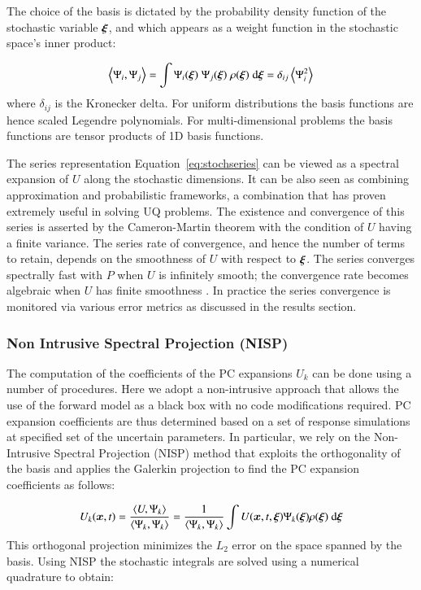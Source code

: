 The choice of the basis is dictated by the probability density
function of the stochastic variable $\xxi$, and which appears as a weight
function in the stochastic space's inner product:

\begin{equation}
 \left<\Psi_i,\Psi_j\right> = \int \Psi_i(\xxi) \;\Psi_j(\xxi) \; \rho(\xxi) \; \mbox{d}\xxi=\delta_{ij}\ave{\Psi_i^2}
\label{eq:inner}
\end{equation}
where $\delta_{ij}$ is the Kronecker delta.
For uniform
distributions the basis functions are hence scaled Legendre polynomials.
For multi-dimensional problems the basis functions are
tensor products of 1D basis functions.

The series representation Equation~\eqref{eq:stochseries} can be viewed as a spectral expansion
of $U$ along the stochastic dimensions. It can be also seen as
combining approximation and probabilistic frameworks, a combination
that has proven extremely useful in solving UQ problems. The existence and convergence of this series
is asserted by the Cameron-Martin theorem \citep{Cameron:1947} with the condition of $U$ having a finite variance.
The series rate of convergence, and hence the number of terms to retain, depends on the smoothness of
$U$ with respect to $\xxi$. The series converges spectrally fast with $P$
when $U$ is infinitely smooth; the convergence rate becomes algebraic
when $U$ has finite smoothness \citep{Canuto:2006}. In practice the series convergence is monitored 
via various error metrics as discussed in the results section.

\subsubsection{Non Intrusive Spectral Projection (NISP)}
The computation of the coefficients of the PC expansions $U_k$
can be done using a number of procedures. Here we adopt a non-intrusive
approach that allows the use of the forward model \geoclaw as a black box
with no code modifications required. PC expansion coefficients are thus determined
based on a set of response \geoclaw simulations at specified set of the uncertain parameters. 
In particular, we rely on the Non-Intrusive Spectral Projection (NISP) method that exploits the orthogonality of the basis and applies the Galerkin projection to find the PC expansion coefficients as follows:

\begin{equation}
 U_k(\bm{x},t) = \frac{\left< U, \Psi_k \right>}{\left< \Psi_k, \Psi_k \right>} = 
 \frac{1}{\left< \Psi_k, \Psi_k \right>} 
 \int U(\bm{x},t,\xxi) \Psi_k(\xxi) \rho(\xxi) \mbox{ d}\xxi
\end{equation}
This orthogonal projection minimizes the $L_2$ error on the space spanned by the basis.
Using NISP the stochastic integrals are solved using a numerical quadrature to obtain:

